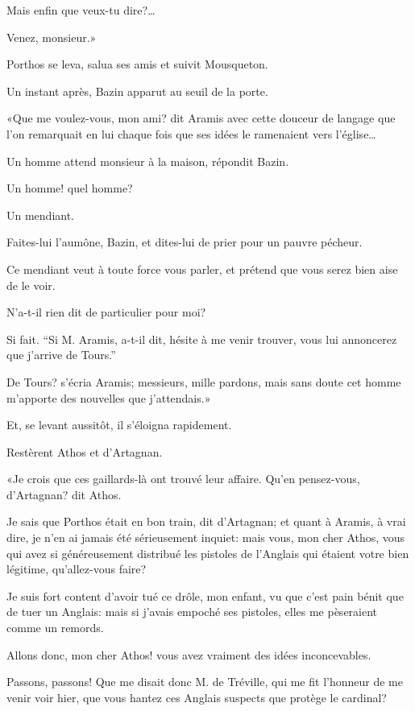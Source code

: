 \speak  Mais enfin que veux-tu dire?\dots 

\speak  Venez, monsieur.» 

Porthos se leva, salua ses amis et suivit Mousqueton. 

Un instant après, Bazin apparut au seuil de la porte. 

«Que me voulez-vous, mon ami? dit Aramis avec cette douceur de langage que l'on remarquait en lui chaque fois que ses idées le ramenaient vers l'église\dots 

\speak  Un homme attend monsieur à la maison, répondit Bazin. 

\speak  Un homme! quel homme? 

\speak  Un mendiant. 

\speak  Faites-lui l'aumône, Bazin, et dites-lui de prier pour un pauvre pécheur. 

\speak  Ce mendiant veut à toute force vous parler, et prétend que vous serez bien aise de le voir. 

\speak  N'a-t-il rien dit de particulier pour moi? 

\speak  Si fait. “Si M. Aramis, a-t-il dit, hésite à me venir trouver, vous lui annoncerez que j'arrive de Tours.” 

\speak  De Tours? s'écria Aramis; messieurs, mille pardons, mais sans doute cet homme m'apporte des nouvelles que j'attendais.» 

Et, se levant aussitôt, il s'éloigna rapidement. 

Restèrent Athos et d'Artagnan. 

«Je crois que ces gaillards-là ont trouvé leur affaire. Qu'en pensez-vous, d'Artagnan? dit Athos. 

\speak  Je sais que Porthos était en bon train, dit d'Artagnan; et quant à Aramis, à vrai dire, je n'en ai jamais été sérieusement inquiet: mais vous, mon cher Athos, vous qui avez si généreusement distribué les pistoles de l'Anglais qui étaient votre bien légitime, qu'allez-vous faire? 

\speak  Je suis fort content d'avoir tué ce drôle, mon enfant, vu que c'est pain bénit que de tuer un Anglais: mais si j'avais empoché ses pistoles, elles me pèseraient comme un remords. 

\speak  Allons donc, mon cher Athos! vous avez vraiment des idées inconcevables. 

\speak  Passons, passons! Que me disait donc M. de Tréville, qui me fit l'honneur de me venir voir hier, que vous hantez ces Anglais suspects que protège le cardinal? 

